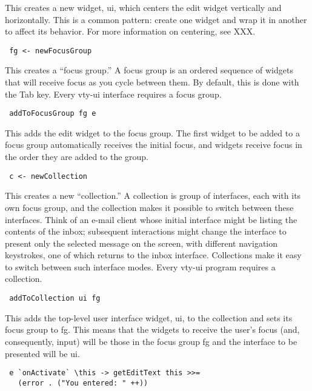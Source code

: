 This creates a new widget, ui, which centers the edit widget vertically
and horizontally.  This is a common pattern: create one widget and wrap
it in another to affect its behavior.  For more information on
centering, see XXX.

\begin{verbatim}
 fg <- newFocusGroup
\end{verbatim}

This creates a “focus group.”  A focus group is an ordered sequence of
widgets that will receive focus as you cycle between them.  By default,
this is done with the Tab key.  Every vty-ui interface requires a focus
group.

\begin{verbatim}
 addToFocusGroup fg e
\end{verbatim}

This adds the edit widget to the focus group.  The first widget to be
added to a focus group automatically receives the initial focus, and
widgets receive focus in the order they are added to the group.

\begin{verbatim}
 c <- newCollection
\end{verbatim}

This creates a new “collection.”  A collection is group of interfaces,
each with its own focus group, and the collection makes it possible to
switch between these interfaces.  Think of an e-mail client whose
initial interface might be listing the contents of the inbox; subsequent
interactions might change the interface to present only the selected
message on the screen, with different navigation keystrokes, one of
which returns to the inbox interface.  Collections make it easy to
switch between such interface modes.  Every vty-ui program requires a
collection.

\begin{verbatim}
 addToCollection ui fg
\end{verbatim}

This adds the top-level user interface widget, ui, to the collection and
sets its focus group to fg.  This means that the widgets to receive the
user’s focus (and, consequently, input) will be those in the focus group
fg and the interface to be presented will be ui.

\begin{verbatim}
 e `onActivate` \this -> getEditText this >>=
   (error . ("You entered: " ++))
\end{verbatim}

